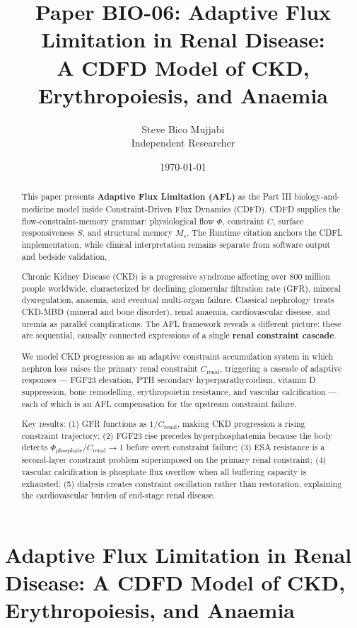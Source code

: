 \documentclass[12pt,a4paper]{article}
\title{\textbf{Paper BIO-06: Adaptive Flux Limitation in Renal Disease:\\ A CDFD Model of CKD, Erythropoiesis, and Anaemia}}
\author{Steve Bico Mujjabi\\ \small Independent Researcher}
\date{\today}
\begin{document}
\maketitle

\clearpage
\section*{Adaptive Flux Limitation in Renal Disease: A CDFD Model of CKD, Erythropoiesis, and Anaemia}

\begin{abstract}

This paper presents \textbf{Adaptive Flux Limitation (AFL)} as the Part III biology-and-medicine model inside Constraint-Driven Flux Dynamics (CDFD). CDFD supplies the flow-constraint-memory grammar: physiological flow $\Phi$, constraint $C$, surface responsiveness $S$, and structural memory $M_s$. The Runtime citation anchors the CDFL implementation, while clinical interpretation remains separate from software output and bedside validation.

Chronic Kidney Disease (CKD) is a progressive syndrome affecting over 800 million people worldwide, characterized by declining glomerular filtration rate (GFR), mineral dysregulation, anaemia, and eventual multi-organ failure. Classical nephrology treats CKD-MBD (mineral and bone disorder), renal anaemia, cardiovascular disease, and uremia as parallel complications. The AFL framework reveals a different picture: these are sequential, causally connected expressions of a single \textbf{renal constraint cascade}.

We model CKD progression as an adaptive constraint accumulation system in which nephron loss raises the primary renal constraint $C_{\mathrm{renal}}$, triggering a cascade of adaptive responses --- FGF23 elevation, PTH secondary hyperparathyroidism, vitamin D suppression, bone remodelling, erythropoietin resistance, and vascular calcification --- each of which is an AFL compensation for the upstream constraint failure.

Key results: (1) GFR functions as $1/C_{\mathrm{renal}}$, making CKD progression a rising constraint trajectory; (2) FGF23 rise precedes hyperphosphatemia because the body detects $\Phi_{\mathrm{phosphate}}/C_{\mathrm{renal}} \to 1$ before overt constraint failure; (3) ESA resistance is a second-layer constraint problem superimposed on the primary renal constraint; (4) vascular calcification is phosphate flux overflow when all buffering capacity is exhausted; (5) dialysis creates constraint oscillation rather than restoration, explaining the cardiovascular burden of end-stage renal disease.


\end{abstract}
\end{document}

